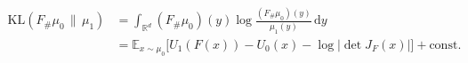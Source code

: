 \documentclass[border=2pt,12pt]{standalone}
\begin{document}
$\displaystyle
\begin{aligned}
\mathrm{KL}(F_{\#}\mu_0 \,\|\, \mu_1)
& = \int_{\mathbb{R}^d} (F_{\#}\mu_0)(y) \log \frac{(F_{\#}\mu_0)(y)}{\mu_1(y)} \, \mathrm{d}y \\
& = \mathbb{E}_{x \sim \mu_0} \bigl[ U_1(F(x)) - U_0(x) - \log |\det J_F(x)| \bigr] + \mathrm{const}.
\end{aligned}$
\end{document}
